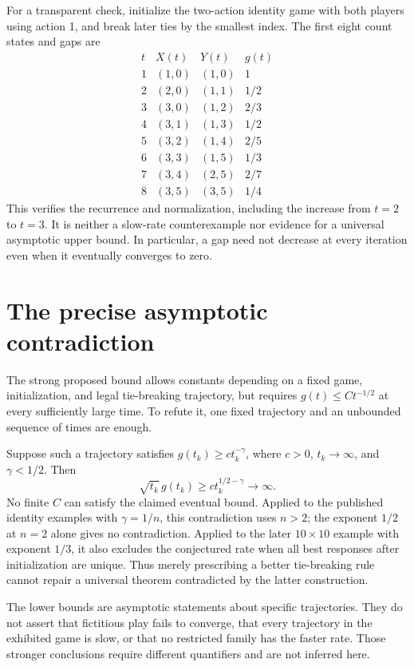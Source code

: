 \documentclass[11pt]{article}
\begin{document}
For a transparent check, initialize the two-action identity game with
both players using action 1, and break later ties by the smallest index.
The first eight count states and gaps are
\[
 \begin{array}{c|c|c|c}
 t&X(t)&Y(t)&g(t)\\\hline
 1&(1,0)&(1,0)&1\\
 2&(2,0)&(1,1)&1/2\\
 3&(3,0)&(1,2)&2/3\\
 4&(3,1)&(1,3)&1/2\\
 5&(3,2)&(1,4)&2/5\\
 6&(3,3)&(1,5)&1/3\\
 7&(3,4)&(2,5)&2/7\\
 8&(3,5)&(3,5)&1/4
 \end{array}
\]
This verifies the recurrence and normalization, including the increase
from $t=2$ to $t=3$. It is neither a slow-rate counterexample nor evidence
for a universal asymptotic upper bound. In particular, a gap need not
decrease at every iteration even when it eventually converges to zero.

\section*{The precise asymptotic contradiction}
The strong proposed bound allows constants depending on a fixed game,
initialization, and legal tie-breaking trajectory, but requires
$g(t)\leq Ct^{-1/2}$ at every sufficiently large time. To refute it, one
fixed trajectory and an unbounded sequence of times are enough.

Suppose such a trajectory satisfies $g(t_k)\geq c t_k^{-\gamma}$,
where $c>0$, $t_k\to\infty$, and $\gamma<1/2$. Then
\[
                    \sqrt{t_k}\,g(t_k)
                    \geq c t_k^{1/2-\gamma}\longrightarrow\infty.
\]
No finite $C$ can satisfy the claimed eventual bound. Applied to the
published identity examples with $\gamma=1/n$, this contradiction uses
$n>2$; the exponent $1/2$ at $n=2$ alone gives no contradiction. Applied
to the later $10\times10$ example with exponent $1/3$, it also excludes
the conjectured rate when all best responses after initialization are
unique. Thus merely prescribing a better tie-breaking rule cannot repair
a universal theorem contradicted by the latter construction.

The lower bounds are asymptotic statements about specific trajectories.
They do not assert that fictitious play fails to converge, that every
trajectory in the exhibited game is slow, or that no restricted family
has the faster rate. Those stronger conclusions require different
quantifiers and are not inferred here.
\end{document}
